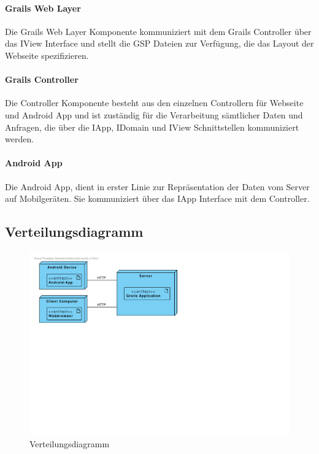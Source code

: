 \paragraph{Grails Web Layer} Die Grails Web Layer Komponente kommuniziert mit dem Grails Controller \"uber das IView Interface und stellt die GSP Dateien zur Verf\"ugung, die das Layout der Webseite spezifizieren.

\paragraph{Grails Controller} Die Controller Komponente besteht aus den einzelnen Controllern f\"ur Webseite und Android App und ist zust\"andig f\"ur die Verarbeitung s\"amtlicher Daten und Anfragen, die \"uber die IApp, IDomain und IView Schnittstellen kommuniziert werden.

\paragraph{Android App} Die Android App, dient in erster Linie zur Repr\"asentation der Daten vom Server auf Mobilger\"aten. Sie kommuniziert \"uber das IApp Interface mit dem Controller.

\subsection{Verteilungsdiagramm}

\begin{figure}[H]
  \centering
  \includegraphics[width=\textwidth, trim=1cm 11cm 4cm 1cm, clip]{gfx/deployment_diagram}
  \caption{Verteilungsdiagramm}
\end{figure}

